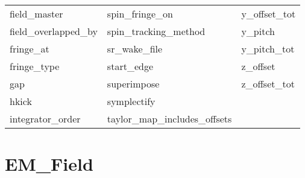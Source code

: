 \begin{tabular}{lll}
field_master                & spin_fringe_on              & y_offset_tot                \\
field_overlapped_by         & spin_tracking_method        & y_pitch                     \\
fringe_at                   & sr_wake_file                & y_pitch_tot                 \\
fringe_type                 & start_edge                  & z_offset                    \\
gap                         & superimpose                 & z_offset_tot                \\
hkick                       & symplectify                 &                             \\
integrator_order            & taylor_map_includes_offsets &                             \\
 \bottomrule
 \end{tabular}
 \vfill
 
 \section{EM_Field}
 \label{s:list.em.field}
 
